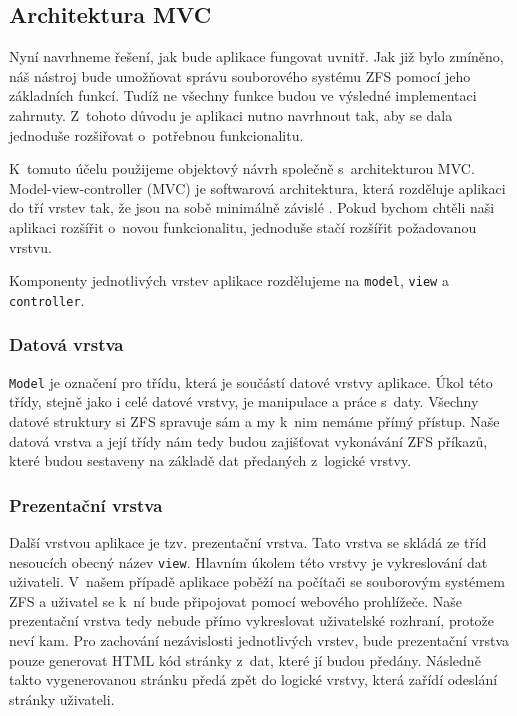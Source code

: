     \subsection{Architektura MVC}
    Nyní navrhneme řešení, jak bude aplikace fungovat uvnitř. Jak již bylo zmíněno, náš nástroj bude umožňovat správu souborového systému ZFS pomocí jeho základních funkcí. Tudíž ne všechny funkce budou ve výsledné implementaci zahrnuty. Z~tohoto důvodu je aplikaci nutno navrhnout tak, aby se dala jednoduše rozšiřovat o~potřebnou funkcionalitu.

    K~tomuto účelu použijeme objektový návrh společně s~architekturou MVC. Model-view-controller (MVC) je softwarová architektura, která rozděluje aplikaci do tří vrstev tak, že jsou na sobě minimálně závislé \cite{mvc}. Pokud bychom chtěli naši aplikaci rozšířit o~novou funkcionalitu, jednoduše stačí rozšířit požadovanou vrstvu.

    Komponenty jednotlivých vrstev aplikace rozdělujeme na \verb|model|, \verb|view| a \verb|controller|.

        \subsubsection{Datová vrstva}
        \verb|Model| je označení pro třídu, která je součástí datové vrstvy aplikace. Úkol této třídy, stejně jako i celé datové vrstvy, je manipulace a práce s~daty. Všechny datové struktury si ZFS spravuje sám a my k~nim nemáme přímý přístup. Naše datová vrstva a její třídy nám tedy budou zajišťovat vykonávání ZFS příkazů, které budou sestaveny na základě dat předaných z~logické vrstvy.
        \subsubsection{Prezentační vrstva}
        Další vrstvou aplikace je tzv. prezentační vrstva. Tato vrstva se skládá ze tříd nesoucích obecný název \verb|view|. Hlavním úkolem této vrstvy je vykreslování dat uživateli. V~našem případě aplikace poběží na počítači se souborovým systémem ZFS a uživatel se k~ní bude připojovat pomocí webového prohlížeče. Naše prezentační vrstva tedy nebude přímo vykreslovat uživatelské rozhraní, protože neví kam. Pro zachování nezávislosti jednotlivých vrstev, bude prezentační vrstva pouze generovat HTML kód stránky z~dat, které jí budou předány. Následně takto vygenerovanou stránku předá zpět do logické vrstvy, která zařídí odeslání stránky uživateli.
